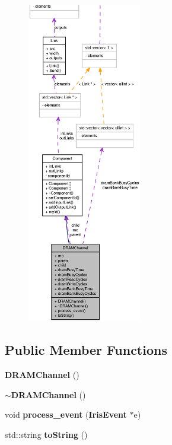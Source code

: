 \begin{figure}[H]
\begin{center}
\leavevmode
\includegraphics[height=400pt]{classDRAMChannel__coll__graph}
\end{center}
\end{figure}
\subsection*{Public Member Functions}
\begin{CompactItemize}
\item 
{\bf DRAMChannel} ()
\item 
{\bf $\sim$DRAMChannel} ()
\item 
void {\bf process\_\-event} ({\bf IrisEvent} $\ast$e)
\item 
std::string {\bf toString} ()
\end{CompactItemize}
